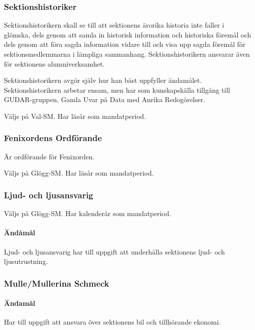 \documentclass{dgovdoc}
\begin{document}
\subsubsection{Sektionshistoriker}

Sektionshistorikern skall se till att sektionens ärorika historia inte faller i
glömska, dels genom att samla in historisk information och historiska föremål
och dels genom att föra sagda information vidare till och visa upp sagda
föremål för sektionsmedlemmarna i lämpliga sammanhang. Sektionshistorikern
ansvarar även för sektionens alumniverksamhet.

Sektionshistorikern avgör själv hur han bäst uppfyller ändamålet.
Sektionshistorikern arbetar ensam, men har som kunskapskälla tillgång till
GUDAR-gruppen, Gamla Uvar på Data med Anrika Redogörelser.

Väljs på Val-SM. Har läsår som mandatperiod.

\subsubsection{Fenixordens Ordförande}

Är ordförande för Fenixorden.

Väljs på Glögg-SM. Har läsår som mandatperiod.

\subsubsection{Ljud- och ljusansvarig}

Väljs på Glögg-SM. Har kalenderår som mandatperiod.

\paragraph{Ändåmål}

Ljud- och ljusansvarig har till uppgift att underhålla sektionens ljud- och
ljusutrustning.

\subsubsection{Mulle/Mullerina Schmeck}

\paragraph{Ändamål}

Har till uppgift att ansvara över sektionens bil och tillhörande ekonomi.
\end{document}
